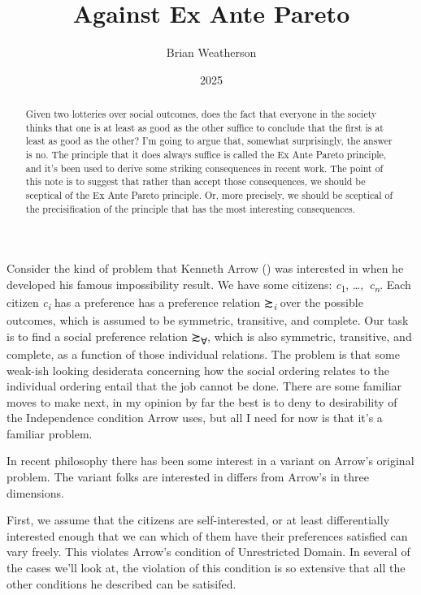 \documentclass[
  11pt,
  letterpaper,
  DIV=11,
  numbers=noendperiod,
  twoside]{scrartcl}
\title{Against Ex Ante Pareto}
\author{Brian Weatherson}
\date{2025}
\begin{document}
\maketitle
\begin{abstract}
Given two lotteries over social outcomes, does the fact that everyone in
the society thinks that one is at least as good as the other suffice to
conclude that the first is at least as good as the other? I'm going to
argue that, somewhat surprisingly, the answer is no. The principle that
it does always suffice is called the Ex Ante Pareto principle, and it's
been used to derive some striking consequences in recent work. The point
of this note is to suggest that rather than accept those consequences,
we should be sceptical of the Ex Ante Pareto principle. Or, more
precisely, we should be sceptical of the precisification of the
principle that has the most interesting consequences.
\end{abstract}


Consider the kind of problem that Kenneth Arrow
() was interested in when he developed his
famous impossibility result. We have some citizens:
\emph{c}\textsubscript{1}, \ldots,~\emph{c\textsubscript{n}}. Each
citizen \emph{c\textsubscript{i}} has a preference has a preference
relation ≿\textsubscript{\emph{i}} over the possible outcomes, which is
assumed to be symmetric, transitive, and complete. Our task is to find a
social preference relation ≿\textsubscript{∀}, which is also symmetric,
transitive, and complete, as a function of those individual relations.
The problem is that some weak-ish looking desiderata concerning how the
social ordering relates to the individual ordering entail that the job
cannot be done. There are some familiar moves to make next, in my
opinion by far the best is to deny to desirability of the Independence
condition Arrow uses, but all I need for now is that it's a familiar
problem.

In recent philosophy there has been some interest in a variant on
Arrow's original problem. The variant folks are interested in differs
from Arrow's in three dimensions.

First, we assume that the citizens are self-interested, or at least
differentially interested enough that we can which of them have their
preferences satisfied can vary freely. This violates Arrow's condition
of Unrestricted Domain. In several of the cases we'll look at, the
violation of this condition is so extensive that all the other
conditions he described can be satisifed.
\end{document}
